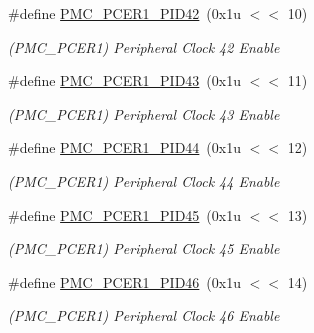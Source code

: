 \begin{DoxyCompactItemize}
\#define \mbox{\hyperlink{group__SAMS70__PMC_ga675b4fb7ad79afa1f77aee029fdf6a8e}{P\+M\+C\+\_\+\+P\+C\+E\+R1\+\_\+\+P\+I\+D42}}~(0x1u $<$$<$ 10)
\begin{DoxyCompactList}\small\item\em (P\+M\+C\+\_\+\+P\+C\+E\+R1) Peripheral Clock 42 Enable \end{DoxyCompactList}\item 
\mbox{\label{group__SAMS70__PMC_ga31ba26a0baa8670c5e0d577215519597}} 
\#define \mbox{\hyperlink{group__SAMS70__PMC_ga31ba26a0baa8670c5e0d577215519597}{P\+M\+C\+\_\+\+P\+C\+E\+R1\+\_\+\+P\+I\+D43}}~(0x1u $<$$<$ 11)
\begin{DoxyCompactList}\small\item\em (P\+M\+C\+\_\+\+P\+C\+E\+R1) Peripheral Clock 43 Enable \end{DoxyCompactList}\item 
\mbox{\label{group__SAMS70__PMC_ga3a00699253fb906fe0afed7b8521b7fa}} 
\#define \mbox{\hyperlink{group__SAMS70__PMC_ga3a00699253fb906fe0afed7b8521b7fa}{P\+M\+C\+\_\+\+P\+C\+E\+R1\+\_\+\+P\+I\+D44}}~(0x1u $<$$<$ 12)
\begin{DoxyCompactList}\small\item\em (P\+M\+C\+\_\+\+P\+C\+E\+R1) Peripheral Clock 44 Enable \end{DoxyCompactList}\item 
\mbox{\label{group__SAMS70__PMC_ga1a86e4b55b50ae5c4581317c9f0e60ee}} 
\#define \mbox{\hyperlink{group__SAMS70__PMC_ga1a86e4b55b50ae5c4581317c9f0e60ee}{P\+M\+C\+\_\+\+P\+C\+E\+R1\+\_\+\+P\+I\+D45}}~(0x1u $<$$<$ 13)
\begin{DoxyCompactList}\small\item\em (P\+M\+C\+\_\+\+P\+C\+E\+R1) Peripheral Clock 45 Enable \end{DoxyCompactList}\item 
\mbox{\label{group__SAMS70__PMC_gaec1d90cc6834c57a2b806752e27e1c45}} 
\#define \mbox{\hyperlink{group__SAMS70__PMC_gaec1d90cc6834c57a2b806752e27e1c45}{P\+M\+C\+\_\+\+P\+C\+E\+R1\+\_\+\+P\+I\+D46}}~(0x1u $<$$<$ 14)
\begin{DoxyCompactList}\small\item\em (P\+M\+C\+\_\+\+P\+C\+E\+R1) Peripheral Clock 46 Enable \end{DoxyCompactList}\item 
$$
\end{DoxyCompactItemize}

